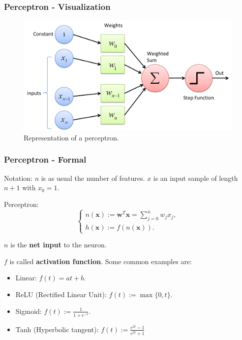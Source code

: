 \documentclass{beamer}
\begin{document}
	\begin{frame}
		\frametitle{Perceptron - Visualization}
		\begin{figure}
			\centering
			\includegraphics[scale=0.2]{images/perceptron}
			\caption{Representation of a perceptron.}
		\end{figure}
	\end{frame}

	\begin{frame}
		\frametitle{Perceptron - Formal}
		Notation: $n$ is as usual the number of features. $x$ is an input sample of length $n+1$ with $x_0 = 1$.
		
		\vspace{5mm}
		
		Perceptron:
		\begin{equation*}
			\begin{cases}
				n(\bm{x}) := \bm{w}^T \bm{x} = \sum_{j=0}^{n} w_j x_j,\\
				h(\bm{x}) := f(n(\bm{x})).
			\end{cases}
		\end{equation*}
	
		$n$ is the \textbf{net input} to the neuron.
		
		\vspace{5mm}
		
		$f$ is called \textbf{activation function}. Some common examples are:
		\begin{itemize}
			\item Linear:  $f(t) = at + b$.
			\item ReLU (Rectified Linear Unit): $f(t) := \max\{0, t\}$.
			\item Sigmoid: $f(t) := \frac{1}{1 + e^{-t}}$.
			\item Tanh (Hyperbolic tangent): $f(t) := \frac{e^{2t}-1}{e^{2t}+1}$
		\end{itemize}
		
	\end{frame}
	
\end{document}

